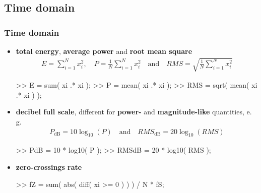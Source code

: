 
\subsection{Time domain}

\begin{frame}[fragile] %
	\frametitle{Time domain}
	\begin{itemize}
		\item \textbf{total energy}, \textbf{average power} and \textbf{root mean square}
			\begin{align*}
				E=\sum_{i=1}^Nx_i^2,\quad P=\frac1N\sum_{i=1}^Nx_i^2\quad\textrm{and}\quad\mathit{RMS}=\sqrt{\frac1N\sum_{i=1}^Nx_i^2}
			\end{align*}
			\begin{code}
>> E = sum( xi .* xi ); \color{medium}%
>> P = mean( xi .* xi ); \color{medium}%
>> RMS = sqrt( mean( xi .* xi ) ); \color{medium}%
			\end{code}
		\item \textbf{decibel full scale}, different for \textbf{power-} and \textbf{magnitude-like} quantities, e.\,g.
			\begin{align*}
				P_{\textrm{dB}}=10\log_{10}(P)\quad\textrm{and}\quad\mathit{RMS}_{\textrm{dB}}=20\log_{10}(\mathit{RMS})
			\end{align*}
			\begin{code}
>> PdB = 10 * log10( P ); \color{medium}%
>> RMSdB = 20 * log10( RMS ); \color{medium}%
			\end{code}
		\item \textbf{zero-crossings rate}
			\begin{code}
>> fZ = sum( abs( diff( xi >= 0 ) ) ) / N * fS;
			\end{code}
	\end{itemize}
\end{frame}

